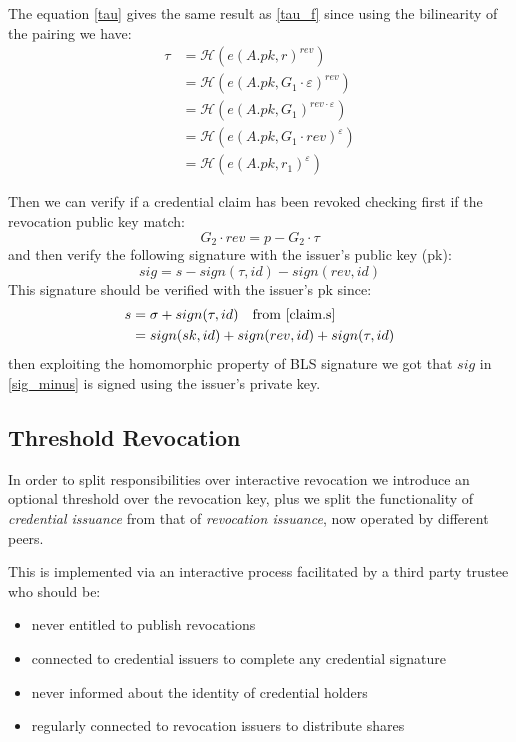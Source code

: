 The equation \eqref{tau} gives the same result as \eqref{tau_f} since using the bilinearity of the pairing \cite{tripartite} we have:
\begin{equation*}
    \begin{split}
        \tau &= \mathcal{H}(e(A.pk, r)^{rev}) \\
        &= \mathcal{H}(e(A.pk, G_1 \cdot \varepsilon)^{rev}) \\
        &= \mathcal{H}(e(A.pk, G_1)^{rev \cdot \varepsilon}) \\
        &= \mathcal{H}(e(A.pk, G_1 \cdot rev)^{\varepsilon}) \\
        &= \mathcal{H}(e(A.pk, r_1)^{\varepsilon})
    \end{split}
\end{equation*}

Then we can verify if a credential claim has been revoked checking first if the revocation public key match:
\begin{equation*}
    G_2 \cdot rev = p - G_2 \cdot \tau
\end{equation*}
and then verify the following signature with the issuer's public key (pk):
\begin{equation}\label{sig_minus}
    sig = s - sign(\tau, id) - sign(rev, id)
\end{equation}
This signature should be verified with the issuer's pk since:
\begin{equation*}
    \begin{split}
        s &= \sigma + sign(\tau, id) \quad \text{from \eqref{claim.s}} \\
        &=  sign(sk, id) + sign(rev, id) + sign(\tau, id)
    \end{split}
\end{equation*}
then exploiting the homomorphic property of BLS signature
we got that $sig$ in \eqref{sig_minus} is signed using the issuer's private key.

\subsection{Threshold Revocation}

In order to split responsibilities over interactive revocation we introduce an optional threshold over the revocation key, plus we split the functionality of \textit{credential issuance} from that of \textit{revocation issuance}, now operated by different peers.

This is implemented via an interactive process facilitated by a third party trustee who should be:
\begin{itemize}
    \item never entitled to publish revocations
    \item connected to credential issuers to complete any credential signature
    \item never informed about the identity of credential holders
    \item regularly connected to revocation issuers to distribute shares
\end{itemize}

